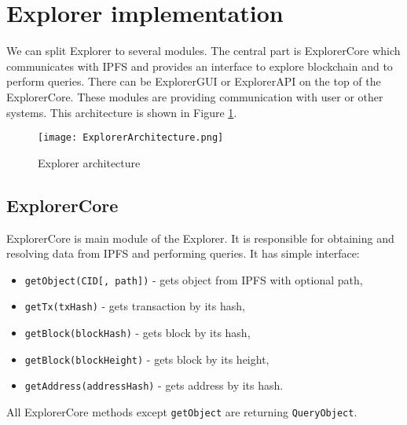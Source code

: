 \section{Explorer implementation}
We can split Explorer to several modules. The central part is ExplorerCore which communicates with IPFS and provides an interface to explore blockchain and to perform queries. There can be ExplorerGUI or ExplorerAPI on the top of the ExplorerCore. These modules are providing communication with user or other systems. This architecture is shown in Figure \ref{ExplorerArchitecture}.

\begin{figure}[h]
    \centering
    \texttt{[image: ExplorerArchitecture.png]}
    \caption{Explorer architecture}
    \label{ExplorerArchitecture}
\end{figure}

\subsection{ExplorerCore}
ExplorerCore is main module of the Explorer. It is responsible for obtaining and resolving data from IPFS and performing queries. It has simple interface:
\begin{itemize}
    \item \texttt{getObject(CID[, path])} - gets object from IPFS with optional path,
    \item \texttt{getTx(txHash)} - gets transaction by its hash,
    \item \texttt{getBlock(blockHash)} - gets block by its hash,
    \item \texttt{getBlock(blockHeight)} - gets block by its height,
    \item \texttt{getAddress(addressHash)} - gets address by its hash.
\end{itemize}
All ExplorerCore methods except \texttt{getObject} are returning \texttt{QueryObject}.

